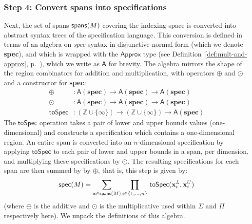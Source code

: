 \documentclass[9pt]{sigplanconf}
\theoremstyle{definition}
\newcommand{\term}[1]{\texttt{#1}}
\newcommand{\vect}[1]{\textbf{#1}}
\begin{document}
\subsubsection{Step 4: Convert spans into specifications}
\label{sec:inf-step4}

\newcommand{\bplus}{\operatornamewithlimits{\term{\huge{+}}}}
\newcommand{\tySum}[1]{#1^{\term{+}}}
\newcommand{\tyProd}[1]{#1^{\term{*}}}
\newcommand{\specDNF}{\textbf{spec}}

Next, the set of spans $\textsf{spans}(M)$ covering the indexing
space is converted into abstract syntax trees 
of the specification language. This conversion is defined in terms
of an algebra on \textit{spec} syntax in disjunctive-normal form
(which we denote \specDNF{}), and which is wrapped
with the $\textsf{Approx}$ type (see
Definition~\ref{def:mult-and-approx},
p.~\pageref{def:mult-and-approx}), which we write as $\mathsf{A}$
for brevity.  The algebra mirrors the shape
of the region combinators for addition and multiplication, 
with operators $\oplus$ and $\odot$ and a constructor for \specDNF{}:
\begin{align*}
\oplus & : \mathsf{A}(\specDNF) \rightarrow \mathsf{A}(\specDNF) \rightarrow
  \mathsf{A}(\specDNF) \\
\odot & : \mathsf{A}(\specDNF) \rightarrow \mathsf{A}(\specDNF) \rightarrow
        \mathsf{A}(\specDNF) \\
\mathsf{toSpec} & : (\mathbb{Z} \cup \{\infty\}) \rightarrow (\mathbb{Z} \cup
  \{\infty\})  \rightarrow \mathsf{A}(\specDNF)
\end{align*}
The $\mathsf{toSpec}$ operation takes a pair of lower and upper bounds
values (one-dimensional) and constructs a specification 
which contains a one-dimensional region. 
An entire span is converted into an $n$-dimensional
specification by applying $\mathsf{toSpec}$ to each
pair of lower and upper bounds in a span, per dimension, and multiplying these
specifications by $\odot$. The resulting specifications for
each span are then summed by by $\oplus$, that is, this step is given by:
\begin{equation*}
\textsf{spec}(M) = 
\sum\limits_{\vect{x} \in \spanOp(M)}
\prod\limits_{i \in \{1, \ldots, n\}} \, \mathsf{toSpec}(\vect{x}^L_i, \vect{x}^U_i)
\end{equation*}
(where $\oplus$ is the additive and $\odot$ is the multiplicative used
within $\Sigma$ and $\Pi$ respectively here).
We unpack the definitions of this algebra.
\end{document}
